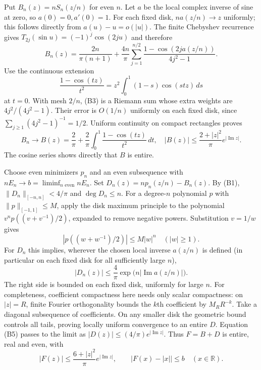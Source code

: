 \documentclass[11pt,a4paper]{article}
\theoremstyle{definition}
\newcommand{\R}{\mathbb R}
\begin{document}
Put $B_n(z)=nS_n(z/n)$ for even $n$. Let $a$ be the local complex
inverse of sine at zero, so $a(0)=0,a'(0)=1$.
For each fixed disk, $n a(z/n)\to z$ uniformly; this follows directly
from $a(u)-u=o(|u|)$. The finite Chebyshev recurrence gives
$T_{2j}(\sin u)=(-1)^j\cos(2ju)$ and therefore
\[
 B_n(z)=\frac{2n}{\pi(n+1)}+
 \frac{4n}{\pi}\sum_{j=1}^{n/2}
       \frac{1-\cos(2ja(z/n))}{4j^2-1}.     \tag{B3}
\]
Use the continuous extension
\[
 \frac{1-\cos(tz)}{t^2}
 =z^2\int_0^1(1-s)\cos(stz)\,ds
\]
at $t=0$. With mesh $2/n$, (B3) is a Riemann sum whose extra
weights are $4j^2/(4j^2-1)$. Their error is $O(1/n)$ uniformly
on each fixed disk, since $\sum_{j\ge1}(4j^2-1)^{-1}=1/2$.
Uniform continuity on compact rectangles proves
\[
 B_n\longrightarrow B(z)=\frac2\pi+
       \frac2\pi\int_0^1\frac{1-\cos(tz)}{t^2}\,dt,
 \quad |B(z)|\le\frac{2+|z|^2}{\pi}e^{|\operatorname{Im}z|}. \tag{B4}
\]
The cosine series shows directly that $B$ is entire.

Choose even minimizers $p_n$ and an even subsequence with
$nE_n\to b=\liminf_{n\text{ even}}nE_n$.
Set $D_n(z)=np_n(z/n)-B_n(z)$. By (B1),
$\|D_n\|_{[-n,n]}<4/\pi$ and $\deg D_n\le n$.
For a degree-$n$ polynomial $p$ with $\|p\|_{[-1,1]}\le M$,
apply the disk maximum principle to the polynomial
$v^np((v+v^{-1})/2)$, expanded to remove negative powers.
Substitution $v=1/w$ gives
\[
 |p((w+w^{-1})/2)|\le M|w|^n\quad(|w|\ge1).
\]
For $D_n$ this implies, wherever the chosen local inverse $a(z/n)$
is defined (in particular on each fixed disk for all sufficiently
large $n$),
\[
 |D_n(z)|\le\frac4\pi
          \exp\bigl(n|\operatorname{Im}a(z/n)|\bigr).       \tag{B5}
\]
The right side is bounded on each fixed disk, uniformly for large $n$.
For completeness, coefficient compactness here needs only scalar
compactness: on $|z|=R$, finite Fourier orthogonality bounds the
$k$th coefficient by $M_RR^{-k}$. Take a diagonal subsequence of
coefficients. On any smaller disk the geometric bound controls all
tails, proving locally uniform convergence to an entire $D$.
Equation (B5) passes to the limit as
$|D(z)|\le(4/\pi)e^{|\operatorname{Im}z|}$.
Thus $F=B+D$ is entire, real and even, with
\[
 |F(z)|\le\frac{6+|z|^2}{\pi}e^{|\operatorname{Im}z|},\qquad
 |F(x)-|x||\le b\quad(x\in\R).              \tag{B6}
\]
\end{document}
